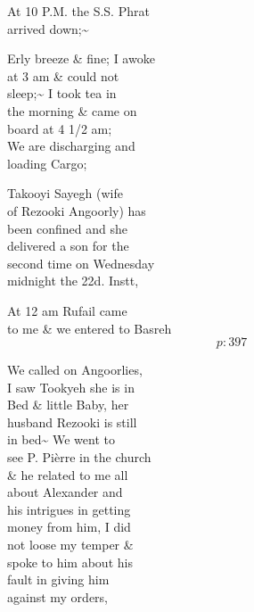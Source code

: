 \documentclass{report}
\begin{document}
	\par{
 	At 10 P.M. the S.S. Phrat\ \\arrived down;\~{}\ \\
	}

	\par{
 	Erly breeze \& fine; I awoke\ \\at 3 am \& could not\ \\sleep;\~{} I took tea in\ \\the morning \& came on\ \\board at 4 1/2 am;\ \\We are discharging and\ \\loading Cargo;\ \\
	}

	\par{
 	Takooyi Sayegh (wife\ \\of Rezooki Angoorly) has\ \\been confined and she\ \\delivered a son for the\ \\second time on Wednesday\ \\midnight the 22d. Instt,\ \\
	}

	\par{
 	At 12 am Rufail came\ \\to me \& we entered to Basreh\ \\
  \[p: 397 \]

	}



	\par{
 	We called on Angoorlies,\ \\I saw Tookyeh she is in\ \\Bed \& little Baby, her\ \\husband Rezooki is still\ \\in bed\~{} We went to\ \\see P. Pièrre in the church\ \\\& he related to me all\ \\about Alexander and\ \\his intrigues in getting\ \\money from him, I did\ \\not loose my temper \&\ \\spoke to him about his\ \\fault in giving him\ \\against my orders,\ \\
	}
\end{document}

